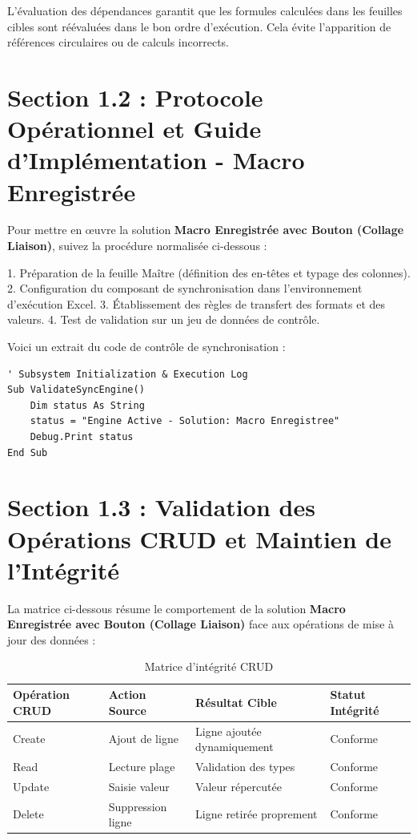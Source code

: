 \documentclass[12pt,a4paper]{report}
\begin{document}
L'évaluation des dépendances garantit que les formules calculées dans les feuilles cibles sont réévaluées dans le bon ordre d'exécution. Cela évite l'apparition de références circulaires ou de calculs incorrects.


\section{Section 1.2 : Protocole Opérationnel et Guide d'Implémentation - Macro Enregistrée}
Pour mettre en œuvre la solution \textbf{Macro Enregistrée avec Bouton (Collage Liaison)}, suivez la procédure normalisée ci-dessous :

1. Préparation de la feuille Maître (définition des en-têtes et typage des colonnes).
2. Configuration du composant de synchronisation dans l'environnement d'exécution Excel.
3. Établissement des règles de transfert des formats et des valeurs.
4. Test de validation sur un jeu de données de contrôle.

Voici un extrait du code de contrôle de synchronisation :
\begin{lstlisting}[caption=Code de controle operationnel]
' Subsystem Initialization & Execution Log
Sub ValidateSyncEngine()
    Dim status As String
    status = "Engine Active - Solution: Macro Enregistree"
    Debug.Print status
End Sub
\end{lstlisting}


\section{Section 1.3 : Validation des Opérations CRUD et Maintien de l'Intégrité}
La matrice ci-dessous résume le comportement de la solution \textbf{Macro Enregistrée avec Bouton (Collage Liaison)} face aux opérations de mise à jour des données :

\begin{table}[h]
\centering
\begin{tabular}{@{}llll@{}}
\toprule
\textbf{Opération CRUD} & \textbf{Action Source} & \textbf{Résultat Cible} & \textbf{Statut Intégrité} \\ \midrule
Create & Ajout de ligne & Ligne ajoutée dynamiquement & Conforme \\
Read & Lecture plage & Validation des types & Conforme \\
Update & Saisie valeur & Valeur répercutée & Conforme \\
Delete & Suppression ligne & Ligne retirée proprement & Conforme \\ \bottomrule
\end{tabular}
\caption{Matrice d'intégrité CRUD}
\end{table}
\end{document}
